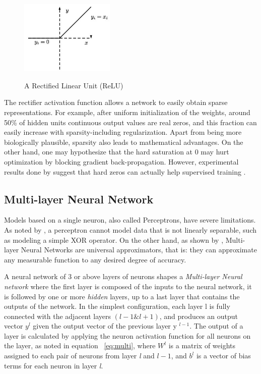 \begin{figure}[H]
	\centering
	{\includegraphics[width=0.4\textwidth]{images/relu}}
	\caption{A Rectified Linear Unit (ReLU)}
	\label{fig:relu}
\end{figure}

\indent The rectifier activation function allows a network to easily obtain sparse representations. For example, after uniform initialization of the weights, around 50\% of hidden units continuous output values are real zeros, and this fraction can easily increase with sparsity-including regularization. Apart from being more biologically plausible, sparsity also leads to mathematical advantages. On the other hand, one may hypothesize that the hard saturation at 0 may hurt optimization by blocking gradient back-propagation. However, experimental results done by \citeauthor{glorot2011deep} suggest that hard zeros can actually help supervised training \cite{glorot2011deep}.  


\subsection{Multi-layer Neural Network}

Models based on a single neuron, also called Perceptrons, have severe limitations. As noted by \citeauthor{preparata2012computational}, a perceptron cannot model data that is not linearly separable, such as modeling a simple XOR operator. On the other hand, as shown by \citealt{hornik1989multilayer}, Multi-layer Neural Networks are universal approximators, that is: they can approximate any measurable function to any desired degree of accuracy.


A neural network of 3 or above layers of neurons shapes a \textit{Multi-layer Neural network} where the first layer is composed of the inputs to the neural network, it is followed by one or more \textit{hidden} layers, up to a last layer that contains the outputs of the network. In the simplest configuration, each layer l is fully connected with the adjacent layers $(l - 1 \& l + 1)$, and produces an output vector $y^{l}$ given the output vector of the previous layer y $^{l-1}$. The output of a layer is calculated by applying the neuron activation function for all neurons on the layer, as noted in equation ~\ref{eq:multi}, where $W^{l}$ is a matrix of weights assigned to each pair of neurons from layer \textit{l} and $l - 1$, and $b^{l}$ is a vector of bias terms for each neuron in layer \textit{l}.

